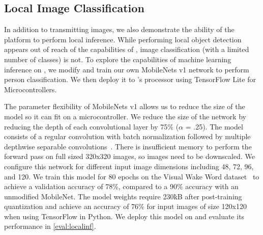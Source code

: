
\subsection{Local Image Classification}
In addition to transmitting images, we also demonstrate the ability of the platform to perform local inference.
While performing local object detection appears out of reach of the capabilities of \name, image classification (with a limited number of classes) is not. 
To explore the capabilities of machine learning inference on \name,
we modify and train our own MobileNets v1 network to perform person classification. We then deploy it to \name's processor using TensorFlow Lite for Microcontrollers. 

The parameter flexibility of MobileNets v1 allows us to reduce the size of the model so it can fit on a microcontroller. We reduce the size of the network by reducing the depth of each convolutional layer by 75\% ($\alpha$ = .25).  
The model consists of a regular convolution with batch normalization followed by multiple depthwise separable convolutions~\cite{howard2017mobilenets}. 
There is insufficient memory to perform the forward pass on full sized 320x320 images, so images need to be downscaled. We configure this network for different input image dimensions including 48, 72, 96, and 120.
We train this model for 80 epochs on the Visual Wake Word dataset~\cite{chowdhery2019visual} to achieve a validation accuracy of 78\%, compared to a 90\% accuracy with an unmodified MobileNet. The model weights require 230\.kB after post-training quantization and achieve an accuracy of 76\% for input images of size 120x120 when using TensorFlow in Python. We deploy this model on \name and evaluate its performance in \cref{eval:localinf}.
